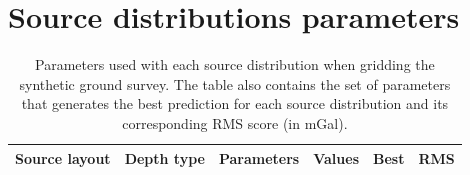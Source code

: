 \documentclass[twocolumn]{article}
\begin{document}





\appendix

\section{Source distributions parameters}

\begin{table}
    \centering
    \caption{
        Parameters used with each source distribution when gridding the
        synthetic ground survey. The table also contains the set of parameters
        that generates the best prediction for each source distribution and its
        corresponding RMS score (in mGal).
    }
    \label{tab:parameters-ground-survey}
    \begin{tabular}{c c l c c c}
        \textbf{Source layout}
            & \textbf{Depth type}
            & \multicolumn{1}{c}{\textbf{Parameters}}
            & \textbf{Values}
            & \textbf{Best}
            & \textbf{RMS} \\
        \toprule


\end{tabular}
\end{table}
\end{document}
